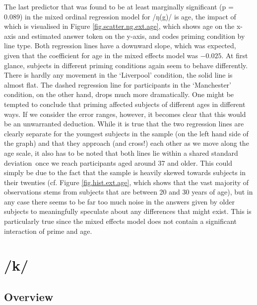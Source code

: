 The last predictor that was found to be at least marginally significant (p = 0.089) in the mixed ordinal regression model for /ŋ(g)/ is age, the impact of which is visualised in Figure \ref{fig.scatter.ng.ext.age}, which shows age on the x-axis and estimated answer token on the y-axis, and codes priming condition by line type.
Both regression lines have a downward slope, which was expected, given that the coefficient for age in the mixed effects model was \ensuremath{-0.025}.
At first glance, subjects in different priming conditions again seem to behave differently.
There is hardly any movement in the `Liverpool' condition, the solid line is almost flat.
The dashed regression line for participants in the `Manchester' condition, on the other hand, drops much more dramatically.
One might be tempted to conclude that priming affected subjects of different ages in different ways.
If we consider the error ranges, however, it becomes clear that this would be an unwarranted deduction.
While it is true that the two regression lines are clearly separate for the youngest subjects in the sample (on the left hand side of the graph) and that they approach (and cross!) each other as we move along the age scale, it also has to be noted that both lines lie within a shared standard deviation\ once we reach participants aged around 37 and older.
This could simply be due to the fact that the sample is heavily skewed towards subjects in their twenties (cf. Figure \ref{fig.hist.ext.age}, which shows that the vast majority of observations stems from subjects that are between 20 and 30 years of age), but in any case there seems to be far too much noise in the answers given by older subjects to meaningfully speculate about any differences that might exist.
This is particularly true since the mixed effects model does not contain a significant interaction of prime and age.

\section{/k/}
\label{sec.perc_res.k}
	\subsection{Overview}
	\label{sec.perc_res.k.overview}


